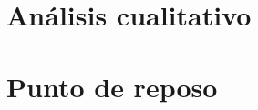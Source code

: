 \section{Análisis cualitativo}
\resetallcounters

\clearpage

\section{Punto de reposo}
\resetallcounters

\clearpage

